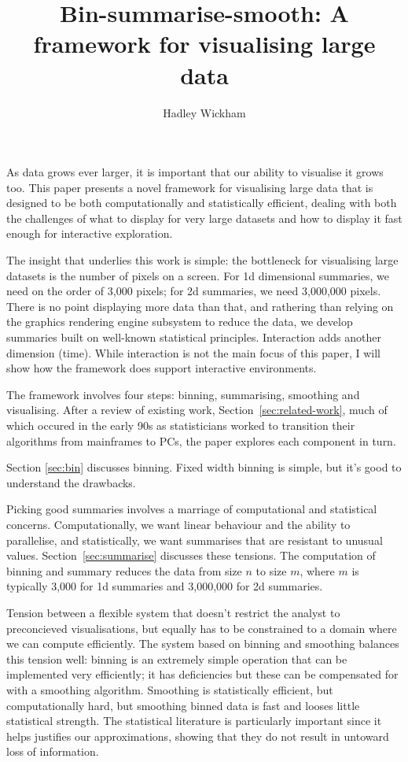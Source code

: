 \documentclass[journal]{vgtc}                %
\title{Bin-summarise-smooth: A framework for visualising large data}
\author{Hadley Wickham}
\begin{document}

\maketitle

As data grows ever larger, it is important that our ability to visualise it grows too. This paper presents a novel framework for visualising large data that is designed to be both computationally and statistically efficient, dealing with both the challenges of what to display for very large datasets and how to display it fast enough for interactive exploration.

The insight that underlies this work is simple: the bottleneck for visualising large datasets is the number of pixels on a screen. For 1d dimensional summaries, we need on the order of 3,000 pixels; for 2d summaries, we need 3,000,000 pixels.  There is no point displaying more data than that, and rathering than relying on the graphics rendering engine subsystem to reduce the data, we develop summaries built on well-known statistical principles. Interaction adds another dimension (time). While interaction is not the main focus of this paper, I will show how the framework does support interactive environments.

The framework involves four steps: binning, summarising, smoothing and visualising. After a review of existing work, Section~\ref{sec:related-work}, much of which occured in the early 90s as statisticians worked to transition their algorithms from mainframes to PCs, the paper explores each component in turn.

Section \ref{sec:bin} discusses binning. Fixed width binning is simple, but it's good to understand the drawbacks.

Picking good summaries involves a marriage of computational and statistical  concerns. Computationally, we want linear behaviour and the ability to parallelise, and statistically, we want summarises that are resistant to unusual values. Section~\ref{sec:summarise} discusses these tensions. The computation of binning and summary reduces the data from size $n$ to size $m$, where $m$ is typically 3,000 for 1d summaries and 3,000,000 for 2d summaries.

Tension between a flexible system that doesn't restrict the analyst to preconcieved visualisations, but equally has to be constrained to a domain where we can compute efficiently. The system based on binning and smoothing balances this tension well: binning is an extremely simple operation that can be implemented very efficiently; it has deficiencies but these can be compensated for with a smoothing algorithm. Smoothing is statistically efficient, but computationally hard, but smoothing binned data is fast and looses little statistical strength. The statistical literature is particularly important since it helps justifies our approximations, showing that they do not result in untoward loss of information.
\end{document}
